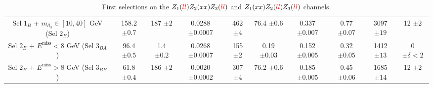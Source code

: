 \documentclass[a4paper,11pt]{article}
\begin{document}
\begin{table}[h!]
\begin{adjustbox}{width=1\textwidth}
\begin{tabular}{|c|c|c|c|c|c|c|c|c|c|}
            \thead{Sel $1_B$ + $m_{ll_3}\in[10,40]$ GeV \\ (Sel $2_B$)} & \thead{158.2\\$\pm0.7$} & \thead{187\\$\pm2$} & \thead{0.0288\\$\pm0.0007$} & \thead{462\\$\pm4$} & \thead{76.4\\$\pm0.6$} & \thead{0.337\\$\pm0.007$} & \thead{0.77\\$\pm0.07$} & \thead{3097\\$\pm19$} & \thead{12\\$\pm2$} \\
            \thead{Sel $2_B$ + $E^{\mbox{miss}}<8$ GeV \\ (Sel $3_{BA}$)} & \thead{96.4\\$\pm0.5$} & \thead{1.4\\$\pm0.2$} & \thead{0.0268\\$\pm0.0007$} & \thead{155\\$\pm2$} & \thead{0.19\\$\pm0.03$} & \thead{0.152\\$\pm0.005$} & \thead{0.32\\$\pm0.05$} & \thead{1412\\$\pm13$} & \thead{0\\$\pm\delta<2$} \\
            \thead{Sel $2_B$ + $E^{\mbox{miss}}>8$ GeV \\ (Sel $3_{BB}$)} & \thead{61.8\\$\pm0.4$} & \thead{186\\$\pm2$} & \thead{0.0020\\$\pm0.0002$} & \thead{307\\$\pm4$} & \thead{76.2\\$\pm0.6$} & \thead{0.185\\$\pm0.005$} & \thead{0.45\\$\pm0.06$} & \thead{1685\\$\pm14$} & \thead{12\\$\pm2$} \\
            \hline
        \end{tabular}
        \end{adjustbox}
        \caption{First selections on the $Z_1(\textcolor{red}{ll})Z_2(xx)Z_3(\textcolor{red}{ll})$ and $Z_1(xx)Z_2(\textcolor{red}{ll})Z_3(\textcolor{red}{ll})$ channels.}
        \label{Cutflowllxxll}
    \end{table}
\end{document}
